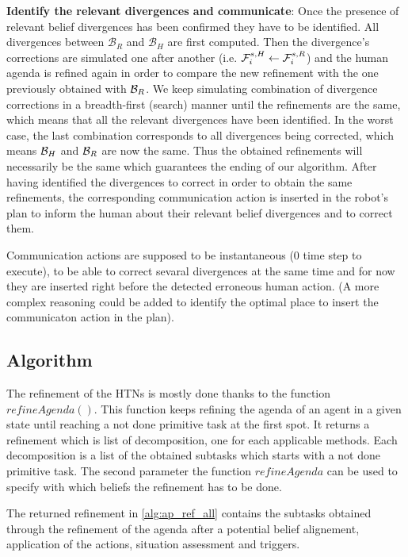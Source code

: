 \documentclass[letterpaper]{article} %
\begin{document}
\textbf{Identify the relevant divergences and communicate}: 
Once the presence of relevant belief divergences has been confirmed they have to be identified. All divergences between $\mathcal{B}_R$ and $\mathcal{B}_H$ are first computed. Then the divergence's corrections are simulated one after another (i.e. $ \mathcal{F}^{s,H}_{i} \gets \mathcal{F}^{s,R}_{i}$) and the human agenda is refined again in order to compare the new refinement with the one previously obtained with $\mathcal{B}_R$. We keep simulating combination of divergence corrections in a breadth-first (search) manner until the refinements are the same, which means that all the relevant divergences have been identified. In the worst case, the last combination corresponds to all divergences being corrected, which means $\mathcal{B}_H$ and $\mathcal{B}_R$ are now the same. Thus the obtained refinements will necessarily be the same which guarantees the ending of our algorithm. After having identified the divergences to correct in order to obtain the same refinements, the corresponding communication action is inserted in the robot's plan to inform the human about their relevant belief divergences and to correct them.
    
Communication actions are supposed to be instantaneous (0 time step to execute), to be able to correct sevaral divergences at the same time and for now they are inserted right before the detected erroneous human action. (A more complex reasoning could be added to identify the optimal place to insert the communicaton action in the plan). 

\subsection{Algorithm}

The refinement of the HTNs is mostly done thanks to the function $refineAgenda()$. This function keeps refining the agenda of an agent in a given state until reaching a not done primitive task at the first spot. It returns a refinement which is list of decomposition, one for each applicable methods. Each decomposition is a list of the obtained subtasks which starts with a not done primitive task. The second parameter the function $refineAgenda$ can be used to specify with which beliefs the refinement has to be done. 

The returned refinement in \ref{alg:ap_ref_all} contains the subtasks obtained through the refinement of the agenda after a potential belief alignement, application of the actions, situation assessment and triggers.
\end{document}
